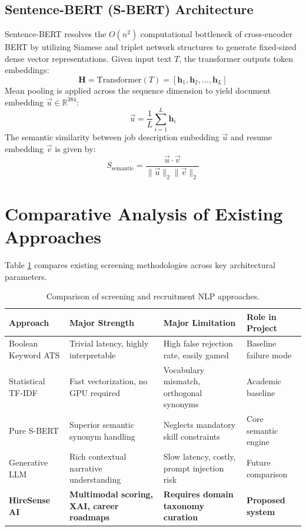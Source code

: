 \documentclass[12pt,a4paper]{report}
\begin{document}
\subsection{Sentence-BERT (S-BERT) Architecture}
Sentence-BERT resolves the $O(n^2)$ computational bottleneck of cross-encoder BERT by utilizing Siamese and triplet network structures to generate fixed-sized dense vector representations. Given input text $T$, the transformer outputs token embeddings:
\begin{equation}
\mathbf{H} = \text{Transformer}(T) = [\mathbf{h}_1, \mathbf{h}_2, \dots, \mathbf{h}_L]
\end{equation}
Mean pooling is applied across the sequence dimension to yield document embedding $\vec{u} \in \mathbb{R}^{384}$:
\begin{equation}
\vec{u} = \frac{1}{L} \sum_{i=1}^L \mathbf{h}_i
\end{equation}
The semantic similarity between job description embedding $\vec{u}$ and resume embedding $\vec{v}$ is given by:
\begin{equation}
S_{\text{semantic}} = \frac{\vec{u} \cdot \vec{v}}{\|\vec{u}\|_2 \|\vec{v}\|_2}
\end{equation}

\section{Comparative Analysis of Existing Approaches}
Table \ref{tab:comparison_approaches} compares existing screening methodologies across key architectural parameters.

\begin{table}[h!]
\centering
\caption{Comparison of screening and recruitment NLP approaches.}
\label{tab:comparison_approaches}
\begin{tabular}{|p{3cm}|p{3.5cm}|p{4cm}|p{3.5cm}|}
\hline
\textbf{Approach} & \textbf{Major Strength} & \textbf{Major Limitation} & \textbf{Role in Project} \\ \hline
Boolean Keyword ATS & Trivial latency, highly interpretable & High false rejection rate, easily gamed & Baseline failure mode \\ \hline
Statistical TF-IDF & Fast vectorization, no GPU required & Vocabulary mismatch, orthogonal synonyms & Academic baseline \\ \hline
Pure S-BERT & Superior semantic synonym handling & Neglects mandatory skill constraints & Core semantic engine \\ \hline
Generative LLM & Rich contextual narrative understanding & Slow latency, costly, prompt injection risk & Future comparison \\ \hline
\textbf{HireSense AI} & \textbf{Multimodal scoring, XAI, career roadmaps} & \textbf{Requires domain taxonomy curation} & \textbf{Proposed system} \\ \hline
\end{tabular}
\end{table}
\end{document}
